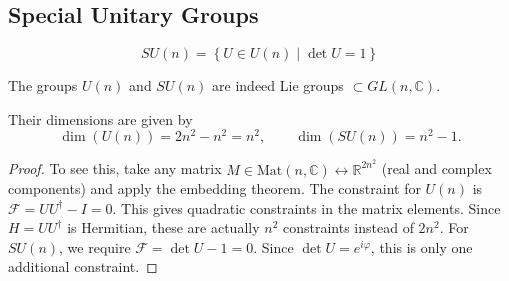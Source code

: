 \subsection{Special Unitary Groups}%
\label{sub:special_unitary_groups}

\begin{equation}
  SU(n) = \left\{ U \in U(n) \mid \det U = 1 \right\}
\end{equation}

The groups $U(n)$ and $SU(n)$ are indeed Lie groups $\subset GL(n, \mathbb{C})$.
\begin{claim}
  Their dimensions are given by
  \begin{equation}
    \dim(U(n)) = 2n^2 - n^2 = n^2, \qquad \dim(SU(n)) = n^2 -1.
  \end{equation}
\end{claim}
\begin{proof}
  To see this, take any matrix $M \in \text{Mat}(n, \mathbb{C}) \leftrightarrow \mathbb{R}^{2n^2}$ (real and complex components) and apply the embedding theorem.
  The constraint for $U(n)$ is  $\mathcal{F} = U U^{\dagger} - I = 0$. This gives quadratic constraints in the matrix elements. Since $H = U U^{\dagger}$ is Hermitian, these are actually $n^2$ constraints instead of $2n^2$.
  For $SU(n)$, we require $\mathcal{F} = \det U - 1 = 0$. Since $\det U = e^{i\varphi}$, this is only one additional constraint.
\end{proof}
